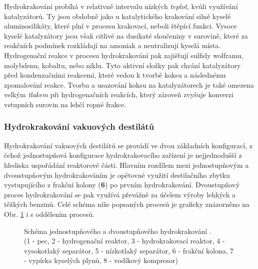 \noindent
Hydrokrakování probíhá v relativně intervalu nízkých \textit{teplot}, kvůli využívání katalyzátorů. Ty jsou obdobně jako u katalytického krakování silně kyselé aluminosilikáty, které plní v procesu krakovací, neboli štěpící funkci. Vysoce kyselé katalyzátory jsou však citlivé na dusíkaté sloučeniny v surovině, které za reakčních podmínek rozkládají na amoniak a neutralizují kyselá místa. Hydrogenační reakce v procesu hydrokrakování pak zajišťují sulfidy wolframu, molybdenu, kobaltu, nebo niklu. Tyto aktivní složky pak chrání katalyzátory před kondenzačními reakcemi, které vedou k tvorbě koksu a následnému zpomalování reakce. Tvorba a usazování koksu na katalyzátorech je také omezena velkým \textit{tlakem} při hydrogenačních reakcích, který zároveň zvyšuje konverzi vstupních surovin na lehčí ropné frakce. \cite{Blazek2006,Speight2020}

\subsubsection{Hydrokrakování vakuových destilátů}
\label{subsubsec:hkvd}

Hydrokrakování vakuových destilátů se provádí ve dvou základních konfigurací, z čehož jednostupňová konfigurace hydrokrakovacího zařízení je nejjednodušší z hlediska uspořádání reaktorové části. Hlavním rozdílem mezi jednostupňovým a dvoustupňovým hydrokrakováním je opětovné využití destilačního zbytku vystupujícího z frakční kolony (\textbf{6}) po prvním hydrokrakování. Dvoustupňový proces hydrokrakování se pak využívá převážně za účelem výroby lehkých a těžkých benzinů. \cite{Blazek2006} Celé schéma níže popsaných procesů je graficky znázorněno na Obr. \ref{fig:hydrokrak_2schema} i s oddělením procesů.
\begin{figure}[h]
    \centering
    
    \caption[Schéma jednostupňového a dvoustupňového hydrokrakování]{Schéma jednostupňového a dvoustupňového hydrokrakování \cite{Blazek2006}.\\(1 - pec, 2 - hydrogenační reaktor, 3 - hydrokrakovací reaktor, 4 - vysokotlaký separátor, 5 - nízkotlaký separátor, 6 - frakční kolona, 7 - vypírka kyselých plynů, 8 - vodíkový kompresor)} \label{fig:hydrokrak_2schema}
\end{figure}

